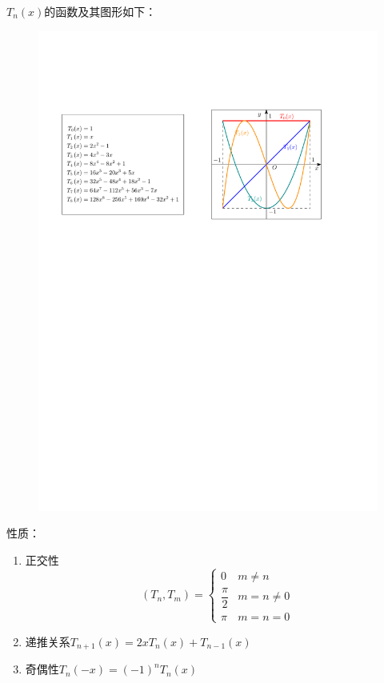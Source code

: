 \begin{note}
    $T_{n}(x)$的函数及其图形如下：
    \begin{figure}[H]
        \centering
        \includegraphics[width = .86\textwidth]{image/ChebyshevTx.pdf}
    \end{figure}
\end{note}
\begin{note}
    性质：
    \begin{enumerate}
        \item 正交性
        \[
            (T_n,T_m)=\begin{cases}
                0&m\neq n\\
                \dfrac{\pi}{2}& m=n\neq 0\\
                \pi & m=n=0
            \end{cases}
        \]
        \item 递推关系$T_{n+1}(x) = 2xT_{n}(x) + T_{n-1}(x)$
        \item 奇偶性$T_n(-x)=(-1)^nT_n(x)$
    \end{enumerate}
\end{note}
